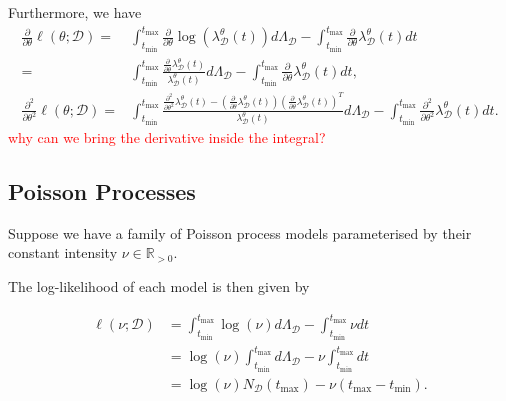 \documentclass[honours,12pt]{unswthesis}
\numberwithin{equation}{section}
\begin{document}
Furthermore, we have
\begin{equation*}
	\begin{align}
		\frac{\partial}{\partial\theta}\ell(\theta;\mathcal{D})
		= & \int_{t_\mathrm{min}}^{t_\mathrm{max}}\frac{\partial}{\partial\theta}\log(\lambda_\mathcal{D}^\theta(t))d\Lambda_\mathcal{D}-\int_{t_\mathrm{min}}^{t_\mathrm{max}}\frac{\partial}{\partial\theta}\lambda_\mathcal{D}^\theta(t) dt\\
		= & \int_{t_\mathrm{min}}^{t_\mathrm{max}}\frac{\frac{\partial}{\partial\theta}\lambda_\mathcal{D}^\theta(t)}{\lambda_\mathcal{D}^\theta(t)}d\Lambda_\mathcal{D}-\int_{t_\mathrm{min}}^{t_\mathrm{max}}\frac{\partial}{\partial\theta}\lambda_\mathcal{D}^\theta(t) dt,\\
		\frac{\partial^2}{\partial\theta^2}\ell(\theta;\mathcal{D})
		= & \int_{t_\mathrm{min}}^{t_\mathrm{max}}\frac{\frac{\partial^2}{\partial\theta^2}\lambda_\mathcal{D}^\theta(t) - \left(\frac{\partial}{\partial\theta}\lambda_\mathcal{D}^\theta(t)\right)\left(\frac{\partial}{\partial\theta}\lambda_\mathcal{D}^\theta(t)\right)^T}{\lambda_\mathcal{D}^\theta(t)}d\Lambda_\mathcal{D} - \int_{t_\mathrm{min}}^{t_\mathrm{max}}\frac{\partial^2}{\partial\theta^2}\lambda_\mathcal{D}^\theta(t) dt.
	\end{align}
\end{equation*}
\textcolor{red}{why can we bring the derivative inside the integral?}

\subsection{Poisson Processes}
Suppose we have a family of Poisson process models parameterised by their constant intensity $\nu\in\mathbb{R}_{>0}$.

The log-likelihood of each model is then given by

\begin{equation}
	\begin{align}
		\ell(\nu;\mathcal{D})
		&= \int_{t_\mathrm{min}}^{t_\mathrm{max}}\log(\nu)d\Lambda_\mathcal{D}-\int_{t_\mathrm{min}}^{t_\mathrm{max}}\nu dt\\
		&= \log(\nu)\int_{t_\mathrm{min}}^{t_\mathrm{max}}d\Lambda_\mathcal{D} - \nu\int_{t_\mathrm{min}}^{t_\mathrm{max}}dt\\
		&= \log(\nu)N_\mathcal{D}\left(t_\mathrm{max}\right) - \nu\left(t_\mathrm{max}-t_\mathrm{min}\right).
	\end{align}
\end{equation}
\end{document}
